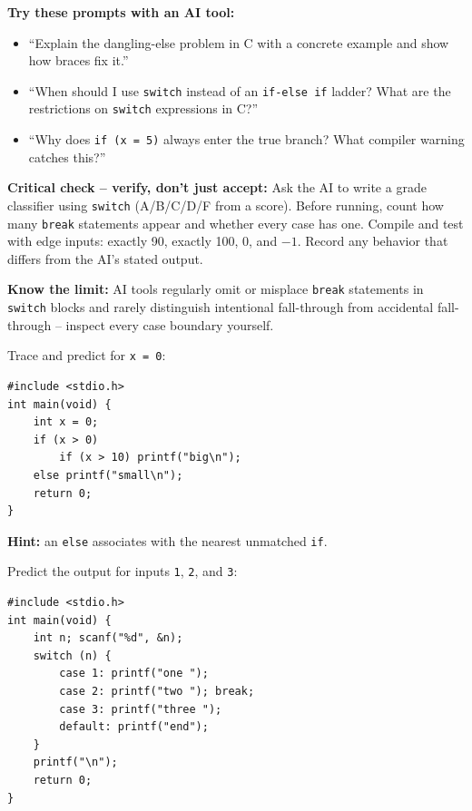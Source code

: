 \documentclass[11pt]{article}
\begin{document}
\begin{aicollab}
\textbf{Try these prompts with an AI tool:}
\begin{itemize}[leftmargin=*,nosep]
  \item ``Explain the dangling-else problem in C with a concrete example and show how
        braces fix it.''
  \item ``When should I use \texttt{switch} instead of an \texttt{if-else if} ladder?
        What are the restrictions on \texttt{switch} expressions in C?''
  \item ``Why does \texttt{if (x = 5)} always enter the true branch? What compiler
        warning catches this?''
\end{itemize}

\medskip\textbf{Critical check -- verify, don't just accept:}
Ask the AI to write a grade classifier using \texttt{switch} (A/B/C/D/F from a score).
Before running, count how many \texttt{break} statements appear and whether every case
has one. Compile and test with edge inputs: exactly 90, exactly 100, 0, and $-1$.
Record any behavior that differs from the AI's stated output.

\medskip\textbf{Know the limit:}
AI tools regularly omit or misplace \texttt{break} statements in \texttt{switch} blocks
and rarely distinguish intentional fall-through from accidental fall-through -- inspect
every case boundary yourself.
\end{aicollab}

\takehomebanner

\begin{trace}
Trace and predict for \texttt{x = 0}:
\begin{lstlisting}
#include <stdio.h>
int main(void) {
    int x = 0;
    if (x > 0)
        if (x > 10) printf("big\n");
    else printf("small\n");
    return 0;
}
\end{lstlisting}
\textbf{Hint:} an \texttt{else} associates with the nearest unmatched \texttt{if}.
\end{trace}

\begin{trace}
Predict the output for inputs \texttt{1}, \texttt{2}, and \texttt{3}:
\begin{lstlisting}
#include <stdio.h>
int main(void) {
    int n; scanf("%d", &n);
    switch (n) {
        case 1: printf("one ");
        case 2: printf("two "); break;
        case 3: printf("three ");
        default: printf("end");
    }
    printf("\n");
    return 0;
}
\end{lstlisting}
\end{trace}
\end{document}
